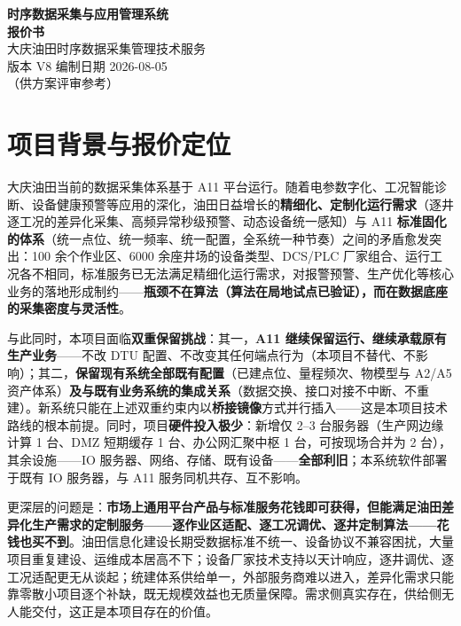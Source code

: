 \documentclass[11pt,a4paper]{ctexart}
\begin{document}
\begin{center}
{\Huge\bfseries 时序数据采集与应用管理系统\\[8pt] 报价书}\\[14pt]
{\large 大庆油田时序数据采集管理技术服务}\\[8pt]
{\large 版本 V8 \quad 编制日期 2026-08-05}\\[4pt]
{\large （供方案评审参考）}
\end{center}

\vspace{1em}
\noindent\hrulefill
\vspace{1em}

\section{项目背景与报价定位}

大庆油田当前的数据采集体系基于 A11 平台运行。随着电参数字化、工况智能诊断、设备健康预警等应用的深化，油田日益增长的\textbf{精细化、定制化运行需求}（逐井逐工况的差异化采集、高频异常秒级预警、动态设备统一感知）与 A11 \textbf{标准固化的体系}（统一点位、统一频率、统一配置，全系统一种节奏）之间的矛盾愈发突出：100 余个作业区、6000 余座井场的设备类型、DCS/PLC 厂家组合、运行工况各不相同，标准服务已无法满足精细化运行需求，对报警预警、生产优化等核心业务的落地形成制约——\textbf{瓶颈不在算法（算法在局地试点已验证），而在数据底座的采集密度与灵活性}。

与此同时，本项目面临\textbf{双重保留挑战}：其一，\textbf{A11 继续保留运行、继续承载原有生产业务}——不改 DTU 配置、不改变其任何端点行为（本项目不替代、不影响）；其二，\textbf{保留现有系统全部既有配置}（已建点位、量程频次、物模型与 A2/A5 资产体系）\textbf{及与既有业务系统的集成关系}（数据交换、接口对接不中断、不重建）。新系统只能在上述双重约束内以\textbf{桥接镜像}方式并行插入——这是本项目技术路线的根本前提。同时，项目\textbf{硬件投入极少}：新增仅 2--3 台服务器（生产网边缘计算 1 台、DMZ 短期缓存 1 台、办公网汇聚中枢 1 台，可按现场合并为 2 台），其余设施——IO 服务器、网络、存储、既有设备——\textbf{全部利旧}；本系统软件部署于既有 IO 服务器，与 A11 服务同机共存、互不影响。

更深层的问题是：\textbf{市场上通用平台产品与标准服务花钱即可获得，但能满足油田差异化生产需求的定制服务——逐作业区适配、逐工况调优、逐井定制算法——花钱也买不到}。油田信息化建设长期受数据标准不统一、设备协议不兼容困扰，大量项目重复建设、运维成本居高不下；设备厂家技术支持以天计响应，逐井调优、逐工况适配更无从谈起；统建体系供给单一，外部服务商难以进入，差异化需求只能靠零散小项目逐个补缺，既无规模效益也无质量保障。需求侧真实存在，供给侧无人能交付，这正是本项目存在的价值。
\end{document}
